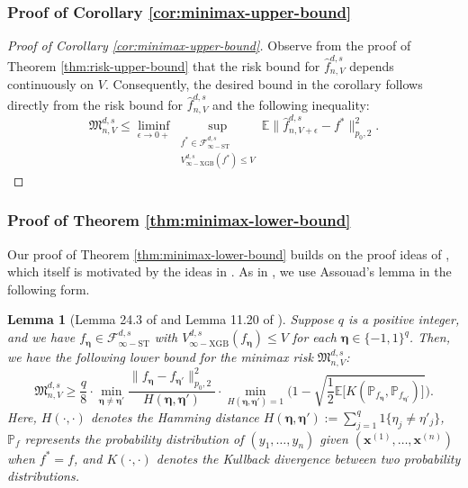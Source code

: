 \documentclass[10pt]{article}
\newtheorem{lemma}{Lemma}
\newcommand{\E}{{\mathbb E}}
\renewcommand{\P}{{\mathbb P}}
\newcommand{\fstinf}{{\mathcal{F}^{d, s}_{\infty-\text{ST}}}}
\newcommand{\vinfxgb}{{V^{d, s}_{\infty-\text{XGB}}}}
\newcommand{\lsefstinf}{{\hat{f}^{d, s}_{n, V}}}
\newcommand{\minimax}{{\mathfrak{M}^{d, s}_{n, V}}}
\newcommand{\xbf}{{\mathbf{x}}}
\newcommand{\etabf}{{\boldsymbol{\eta}}}
\begin{document}
\subsubsection{Proof of Corollary \ref{cor:minimax-upper-bound}}
\label{pf:minimax-upper-bound}
\begin{proof}[Proof of Corollary \ref{cor:minimax-upper-bound}]
Observe from the proof of Theorem \ref{thm:risk-upper-bound} that 
the risk bound for $\lsefstinf$ depends continuously on $V$.
Consequently, the desired bound in the corollary follows directly 
from the risk bound for $\lsefstinf$ and the following inequality:
\begin{equation*}
    \minimax \le \liminf_{\epsilon \to 0+} 
    \sup_{\substack{f^* \in \fstinf \\ 
    \vinfxgb(f^*) \le V}} 
    \E \|\hat{f}^{d, s}_{n, V + \epsilon} - f^*\|_{p_0, 2}^2.
\end{equation*}
\end{proof}


\subsubsection{Proof of Theorem \ref{thm:minimax-lower-bound}}
\label{pf:minimax-lower-bound}
Our proof of Theorem \ref{thm:minimax-lower-bound} builds on the proof ideas of
\citet[Theorem 4.6]{fang2021multivariate}, which itself is motivated by the 
ideas in \citet[Section 4]{blei2007metric}. As in \citet[Theorem 4.6]{fang2021multivariate}, 
we use Assouad's lemma in the following form.

\begin{lemma}[Lemma 24.3 of \citet{van2000asymptotic} 
and Lemma 11.20 of \citet{ki2024mars}]
\label{lem:assouad}
Suppose $q$ is a positive integer, and we have $f_{\etabf} \in \fstinf$ with 
$\vinfxgb(f_{\etabf}) \le V$ for each $\etabf \in \{-1, 1\}^q$. Then, we have 
the following lower bound for the minimax risk $\minimax$:
\begin{equation*}
    \minimax \ge \frac{q}{8} \cdot \min_{\etabf \neq \etabf'} 
    \frac{\| f_\etabf - f_{\etabf'} \|_{p_0, 2}^2}{H(\etabf, \etabf')} 
    \cdot \min_{H(\etabf, \etabf') = 1} \bigg(1 - \sqrt{\frac{1}{2} \E 
    \big[ K(\P_{f_{\etabf}}, \P_{f_{\etabf'}}) \big]}\bigg).
\end{equation*}
Here, $H(\cdot, \cdot)$ denotes the Hamming distance 
$H(\etabf, \etabf') := \sum_{j = 1}^{q} 1\{\eta_j \neq \eta'_j\}$, 
$\P_f$ represents the probability distribution of $(y_1, \dots, y_n)$ given 
$(\xbf^{(1)}, \dots, \xbf^{(n)})$ when $f^{*} = f$, and $K(\cdot, \cdot)$ 
denotes the Kullback divergence between two probability distributions.
\end{lemma}
\end{document}
